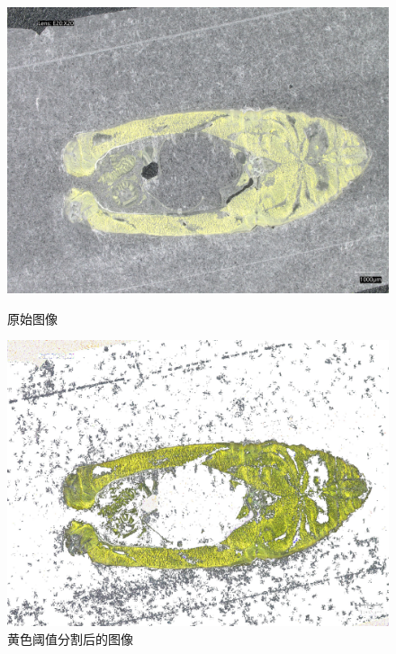 \begin{figure}
    \centering
    \begin{minipage}{0.45\textwidth}
        \centering
        \includegraphics[width=\textwidth]{./fig/model2/origin20240205_161427.jpg}
        \caption{原始图像}
        \label{fig:origin}
    \end{minipage}
    \begin{minipage}{0.45\textwidth}
        \centering
        \includegraphics[width=\textwidth]{./fig/model2/yellow20240205_161427.jpg}
        \caption{黄色阈值分割后的图像}
        \label{fig:yellow}
    \end{minipage}
\end{figure}

